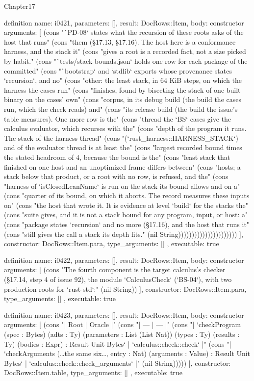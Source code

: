\begin{lexlean}{Chapter17}
\begin{semanticmodule}
definition{
  name: i0421,
  parameters: [],
  result: DocRows::Item,
  body: constructor{
    arguments: [
      (cons "`PD-08` states what the recursion of these roots asks of the host that runs" (cons "them (§17.13, §17.16). The host here is a conformance harness, and the stack it" (cons "gives a root is a recorded fact, not a size picked by habit." (cons "`tests/stack-bounds.json` holds one row for each package of the committed" (cons "`bootstrap` and `stdlib` exports whose provenance states `recursion`, and no" (cons "other: the least stack, in 64 KiB steps, on which the harness the cases run" (cons "finishes, found by bisecting the stack of one built binary on the cases' own" (cons "corpus, in its debug build (the build the cases run, which the check reads) and" (cons "its release build (the build the issue's table measures). One more row is the" (cons "thread the `BS` cases give the calculus evaluator, which recurses with the" (cons "depth of the program it runs. The stack of the harness thread" (cons "(`rust_harness::HARNESS_STACK`) and of the evaluator thread is at least the" (cons "largest recorded bound times the stated headroom of 4, because the bound is the" (cons "least stack that finished on one host and an unoptimized frame differs between" (cons "hosts; a stack below that product, or a root with no row, is refused, and the" (cons "harness of `isClosedLeanName` is run on the stack its bound allows and on a" (cons "quarter of its bound, on which it aborts. The record measures these inputs on" (cons "the host that wrote it. It is evidence at level `build` for the stacks the" (cons "suite gives, and it is not a stack bound for any program, input, or host: a" (cons "package states `recursion` and no more (§17.16), and the host that runs it" (cons "still gives the call a stack its depth fits." (nil String))))))))))))))))))))))
    ],
    constructor: DocRows::Item.para,
    type_arguments: []
  },
  executable: true
}

definition{
  name: i0422,
  parameters: [],
  result: DocRows::Item,
  body: constructor{
    arguments: [
      (cons "The fourth component is the target calculus's checker (§17.14, step 4 of issue 92), the module `CalculusCheck` (`BS-04`), with two production roots for `rust-std`:" (nil String))
    ],
    constructor: DocRows::Item.para,
    type_arguments: []
  },
  executable: true
}

definition{
  name: i0423,
  parameters: [],
  result: DocRows::Item,
  body: constructor{
    arguments: [
      (cons "| Root | Oracle |" (cons "| --- | --- |" (cons "| `checkProgram (spec : Bytes) (adts : Ty) (parameters : List (List Nat)) (types : Ty) (results : Ty) (bodies : Expr) : Result Unit Bytes` | `calculus::check::check` |" (cons "| `checkArguments (…the same six…, entry : Nat) (arguments : Value) : Result Unit Bytes` | `calculus::check::check_arguments` |" (nil String)))))
    ],
    constructor: DocRows::Item.table,
    type_arguments: []
  },
  executable: true
}


\end{semanticmodule}
\end{lexlean}
